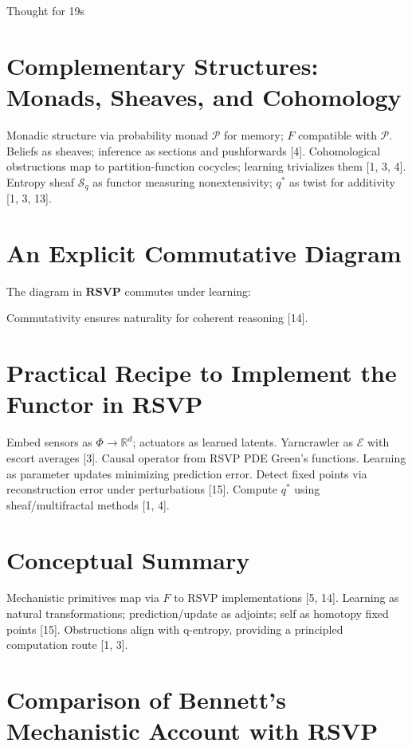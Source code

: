Thought for 19s\documentclass{article}
\begin{document}
\section{Complementary Structures: Monads, Sheaves, and Cohomology}
Monadic structure via probability monad $\mathcal{P}$ for memory; $F$ compatible with $\mathcal{P}$. Beliefs as sheaves; inference as sections and pushforwards [4]. Cohomological obstructions map to partition-function cocycles; learning trivializes them [1, 3, 4]. Entropy sheaf $\mathcal{S}_q$ as functor measuring nonextensivity; $q^*$ as twist for additivity [1, 3, 13].
\section{An Explicit Commutative Diagram}
The diagram in $\mathbf{RSVP}$ commutes under learning:
Commutativity ensures naturality for coherent reasoning [14].
\section{Practical Recipe to Implement the Functor in RSVP}

Embed sensors as $\Phi \to \mathbb{R}^d$; actuators as learned latents.
Yarncrawler as $\mathcal{E}$ with escort averages [3].
Causal operator from RSVP PDE Green's functions.
Learning as parameter updates minimizing prediction error.
Detect fixed points via reconstruction error under perturbations [15].
Compute $q^*$ using sheaf/multifractal methods [1, 4].

\section{Conceptual Summary}
Mechanistic primitives map via $F$ to RSVP implementations [5, 14]. Learning as natural transformations; prediction/update as adjoints; self as homotopy fixed points [15]. Obstructions align with q-entropy, providing a principled computation route [1, 3].
\section{Comparison of Bennett’s Mechanistic Account with RSVP}
\end{document}
